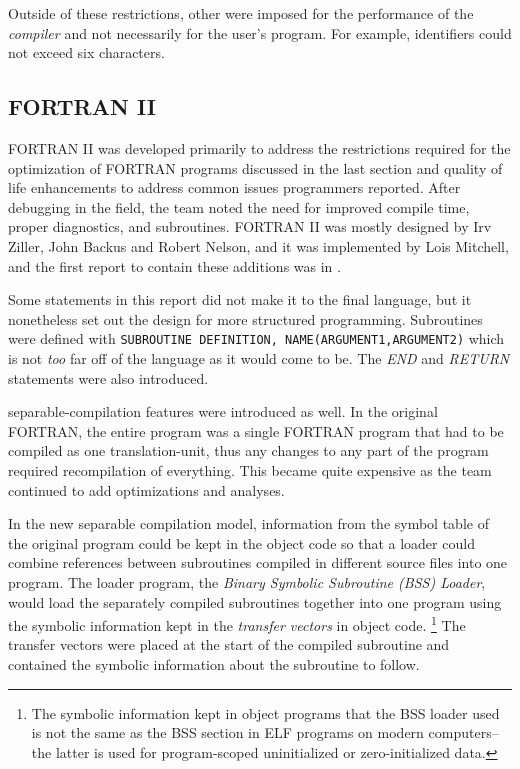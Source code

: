 Outside of these restrictions, other were imposed for the performance of the \textit{compiler}
and not necessarily for the user's program. For example, identifiers could not
exceed six characters.

\subsection{FORTRAN II}

FORTRAN II was developed primarily to address the restrictions required for the
optimization of FORTRAN programs discussed in the last section and quality of
life enhancements to address common issues programmers reported.
After debugging in the field, the team noted the need for improved compile time,
proper diagnostics, and subroutines.
FORTRAN II was mostly designed by Irv Ziller, John Backus and Robert Nelson,
and it was implemented by Lois Mitchell, and
the first report to contain these additions was  in
\citeyear{fortran_ii_proposal_1957}.

Some statements in this report did not make it to the final language, but it
nonetheless set out the design for more structured programming.
Subroutines were defined with \texttt{SUBROUTINE DEFINITION, NAME(ARGUMENT1,ARGUMENT2)}
which is not \textit{too} far off of the language as it would come to be.
The \textit{END} and \textit{RETURN} statements were also introduced.

\Gls{separable-compilation} features were introduced as well.
In the original FORTRAN, the entire program was a single FORTRAN program
that had to be compiled as one \gls{translation-unit}, thus any changes to any
part of the program required recompilation of everything.
This became quite expensive as the team continued to add optimizations
and analyses.

In the new separable compilation model,
information from the symbol table of the original program could be kept
in the object code so that a loader could combine references between subroutines
compiled in different source files into one program.
The loader program, the \textit{Binary Symbolic Subroutine (BSS) Loader},
would load the separately compiled subroutines together into one program using
the symbolic information kept in the \textit{transfer vectors} in object code.
\footnote{The symbolic information kept in object programs that the BSS loader
	used is not the same as the BSS section in ELF programs on modern computers--
	the latter is used for program-scoped uninitialized or zero-initialized data.}
The transfer vectors were placed at the start of the compiled subroutine and
contained the symbolic information about the subroutine to follow.

